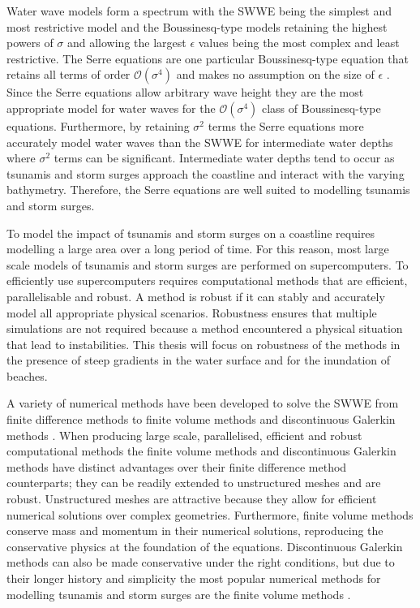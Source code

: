 Water wave models form a spectrum with the SWWE being the simplest and most restrictive model and the Boussinesq-type models retaining the highest powers of $\sigma$ and allowing the largest $\epsilon$ values being the most complex and least restrictive. The Serre equations are one particular Boussinesq-type equation that retains all terms of order $\mathcal{O}\left(\sigma ^4\right)$ and makes no assumption on the size of $\epsilon$ \cite{Bonneton-Lannes-2009-16601}. Since the Serre equations allow arbitrary wave height they are the most appropriate model for water waves for the $\mathcal{O}\left(\sigma ^4\right)$ class of Boussinesq-type equations. Furthermore, by retaining $\sigma^2$ terms the Serre equations more accurately model water waves than the SWWE for intermediate water depths where $\sigma^2$ terms can be significant. Intermediate water depths tend to occur as tsunamis and storm surges approach the coastline and interact with the varying bathymetry. Therefore, the Serre equations are well suited to modelling tsunamis and storm surges. 

To model the impact of tsunamis and storm surges on a coastline requires modelling a large area over a long period of time. For this reason, most large scale models of tsunamis and storm surges are performed on supercomputers. To efficiently use supercomputers requires computational methods that are efficient, parallelisable and robust. A method is robust if it can stably and accurately model all appropriate physical scenarios. Robustness ensures that multiple simulations are not required because a method encountered a physical situation that lead to instabilities. This thesis will focus on robustness of the methods in the presence of steep gradients in the water surface and for the inundation of beaches. 

A variety of numerical methods have been developed to solve the SWWE from finite difference methods \cite{Comcot} to finite volume methods \cite{ClawPack,ANUGA} and discontinuous Galerkin methods \cite{Eskilsson}. When producing large scale, parallelised, efficient and robust computational methods the finite volume methods and discontinuous Galerkin methods have distinct advantages over their finite difference method counterparts; they can be readily extended to unstructured meshes and are robust. Unstructured meshes are attractive because they allow for efficient numerical solutions over complex geometries. Furthermore, finite volume methods conserve mass and momentum in their numerical solutions, reproducing the conservative physics at the foundation of the equations. Discontinuous Galerkin methods can also be made conservative under the right conditions, but due to their longer history and simplicity the most popular numerical methods for modelling tsunamis and storm surges are the finite volume methods \cite{ClawPack,ANUGA}.

